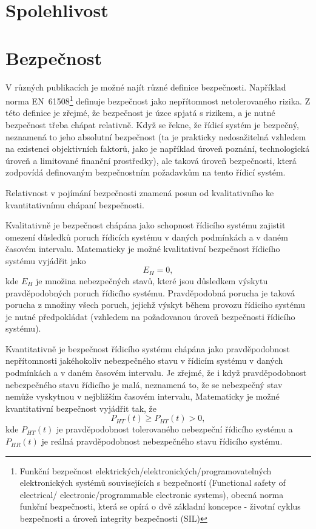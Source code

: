  \section{Spolehlivost}
 \section{Bezpečnost}
    V různých publikacích je možné najít různé definice bezpečnosti. Například norma 
    EN~61508\footnote{Funkční bezpečnost elektrických/elektronických/programovatelných elektronických systémů 
    souvisejících s bezpečností (Functional safety of electrical/ electronic/programmable electronic 
    systems), obecná norma funkční bezpečnosti, která se opírá o dvě základní koncepce - životní cyklus 
    bezpečnosti a úroveň integrity bezpečnosti (SIL)} definuje bezpečnost jako nepřítomnost netolerovaného 
    rizika. Z této definice je zřejmé, že bezpečnost je úzce spjatá s rizikem, a je nutné bezpečnost
    třeba chápat relativně. Když se řekne, že řídicí systém je bezpečný, neznamená to jeho absolutní 
    bezpečnost (ta je prakticky nedosažitelná vzhledem na existenci objektivních faktorů, jako je například 
    úroveň poznání, technologická úroveň a limitované finanční prostředky), ale taková úroveň bezpečnosti, 
    která zodpovídá definovaným bezpečnostním požadavkům na tento řídicí systém. 

    Relativnost v pojímání bezpečnosti znamená posun od kvalitativního ke kvantitativnímu chápaní bezpečnosti.

    Kvalitativně je bezpečnost chápána jako schopnost řídicího systému zajistit omezení důsledků poruch 
    řídicích systému v daných podmínkách a v daném časovém intervalu. Matematicky je možné kvalitativní 
    bezpečnost řídicího systému vyjádřit jako 
    \begin{equation}
      E_H = 0,
    \end{equation}
    kde \(E_H\) je množina nebezpečných stavů, které jsou důsledkem výskytu pravděpodobných poruch řídicího 
    systému. Pravděpodobná porucha je taková porucha z množiny všech poruch, jejichž výskyt během provozu 
    řídicího systému je nutné předpokládat (vzhledem na požadovanou úroveň bezpečnosti řídicího systému).
	
    Kvantitativně je bezpečnost řídicího systému chápána jako pravděpodobnost nepřítomnosti
    jakéhokoliv nebezpečného stavu v řídicím systému v daných podmínkách a v daném časovém
    intervalu. Je zřejmé, že i když pravděpodobnost nebezpečného stavu řídicího je malá, neznamená
    to, že se nebezpečný stav nemůže vyskytnou v nejbližším časovém intervalu, Matematicky je možné
    kvantitativní bezpečnost vyjádřit tak, že
    \begin{equation}
      P_{HT}(t)\geq P_{HT}(t)>0,
    \end{equation}
    kde \(P_{HT}(t)\) je pravděpodobnost tolerovaného nebezpeční řídicího systému a \(P_{HR}(t)\)
    je reálná pravděpodobnost nebezpečného stavu řídicího systému.
	 
